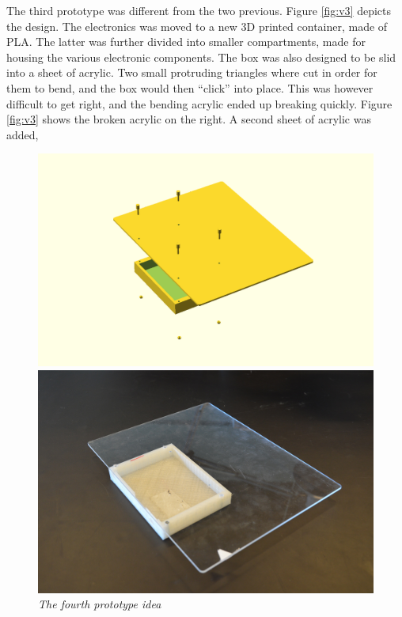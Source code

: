 The third prototype was different from the two previous. Figure \ref{fig:v3} depicts the design. The electronics was moved to a new 3D printed container, made of PLA. The latter was further divided into smaller compartments, made for housing the various electronic components. The box was also designed to be slid into a sheet of acrylic. Two small protruding triangles where cut in order for them to bend, and the box would then ``click'' into place. This was however difficult to get right, and the bending acrylic ended up breaking quickly. Figure \ref{fig:v3} shows the broken acrylic on the right. A second sheet of acrylic was added,




\begin{figure}[h]
\begin{minipage}[b]{7.5cm}
\centering
\includegraphics[scale=0.235]{figures/iterations/v5.png}
\end{minipage}
\begin{minipage}[b]{7.5cm}
\centering
\includegraphics[scale=0.58]{figures/iterations/v5-photo.jpg}
\end{minipage}
\caption{\small {\it {The fourth prototype idea}}} \label{fig:v4}
\end{figure}

